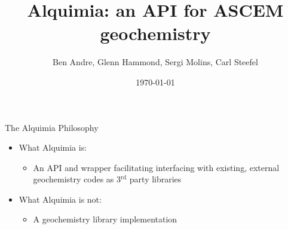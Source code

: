 \documentclass{beamer}
\newcommand\redcolor[1]{{{\color{red} #1}}}
\newcommand\bluecolor[1]{{{\color{blue} #1}}}
\begin{document}
\title[Alquimia]{Alquimia: an API for ASCEM geochemistry}
\author[]{Ben Andre, Glenn Hammond, Sergi Molins, Carl Steefel}
\date{\today}


\frame{\titlepage}

\begin{frame}{The Alquimia Philosophy}
\Large
\begin{itemize}
\item What Alquimia \bluecolor{is}:
\begin{itemize}
\Large
\item An API and wrapper facilitating interfacing with existing, external
      geochemistry codes as 3$^\text{rd}$ party libraries
\end{itemize}

\vspace{1cm}
\item What Alquimia \redcolor{is not}:
\begin{itemize}
\Large
\item A geochemistry library implementation
\end{itemize}
\end{itemize}
\end{frame}
\end{document}
